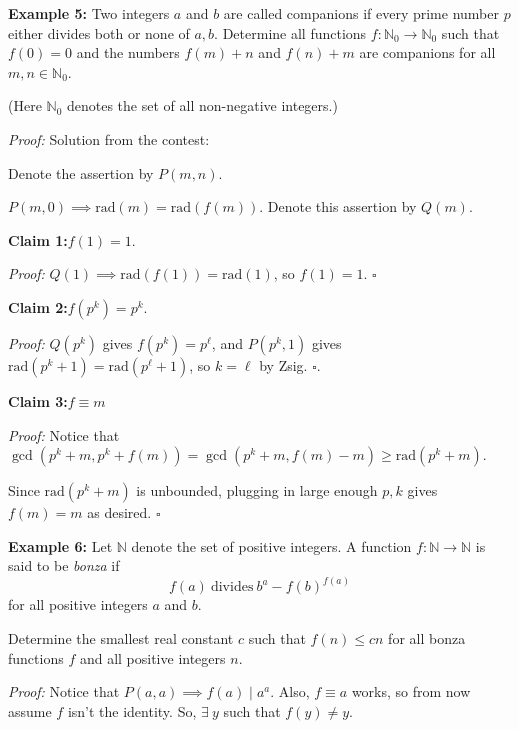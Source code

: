 \documentclass[10pt,letterpaper]{article}
\begin{document}
\par\vspace{12pt}
\begin{tcolorbox}[breakable,title={INMO 2026 P4},colbacktitle=black!4,coltitle=black,fonttitle=\normalfont]
\textbf{Example 5:} Two integers $a$ and $b$ are called companions if every prime number $p$ either divides both or none of $a,b$. Determine all functions $f:\mathbb{N}_0\to\mathbb{N}_0$ such that $f(0)=0$ and the numbers $f(m)+n$ and $f(n)+m$ are companions for all $m,n\in\mathbb{N}_0$.

(Here $\mathbb{N}_0$ denotes the set of all non-negative integers.)
\end{tcolorbox}
\textit{Proof:}
Solution from the contest:

Denote the assertion by $P(m,n)$.

$P(m,0)\implies \text{rad}(m)= \text{rad}(f(m))$. Denote this assertion by $Q(m)$.

\textbf{Claim 1:}$f(1)=1$.

\emph{Proof:} $Q(1)\implies \text{rad}(f(1))= \text{rad}(1)$, so $f(1)=1$. $\square$

\textbf{Claim 2:}$f(p^k)=p^k$.

\emph{Proof:} $Q(p^k)$ gives $f(p^k)=p^{\ell}$, and $P(p^k,1)$ gives $ \text{rad} (p^k+1)= \text{rad} (p^{\ell}+1)$, so $k=\ell$ by Zsig. $\square$.

\textbf{Claim 3:}$f\equiv m$

\emph{Proof:} Notice that $\gcd(p^k+m, p^k+f(m))=\gcd(p^k+m, f(m)-m)\ge \text{rad}(p^k+m)$.

Since $\text{rad}(p^k+m)$ is unbounded, plugging in large enough $p,k$ gives $f(m)=m$ as desired. $\square$
\par{}
\par

\par\vspace{12pt}
\begin{tcolorbox}[breakable,title={IMO 2025 P3},colbacktitle=black!4,coltitle=black,fonttitle=\normalfont]
\textbf{Example 6:} Let $\mathbb{N}$ denote the set of positive integers. A function $f:\mathbb{N}\to\mathbb{N}$ is said to be \textit{bonza} if
\[f(a)\ \text{divides}\ b^a-f(b)^{f(a)}\]
for all positive integers $a$ and $b$.

Determine the smallest real constant $c$ such that $f(n)\leqslant cn$ for all bonza functions $f$ and all positive integers $n$.
\end{tcolorbox}
\textit{Proof:}
Notice that $P(a,a)\implies f(a)\mid a^a$. Also, $f\equiv a$ works, so from now assume $f$ isn't the identity. So, $\exists \ y$ such that $f(y)\neq y$.
\end{document}
